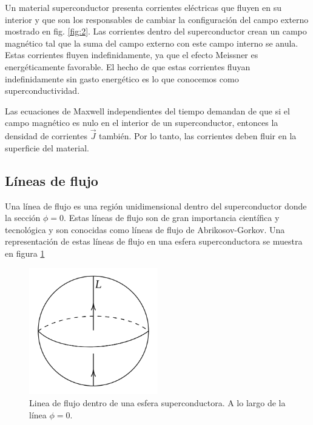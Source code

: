 Un material superconductor presenta corrientes eléctricas que fluyen en su interior y que son los responsables de cambiar la configuración del campo externo mostrado en fig. \ref{fig:2}. Las corrientes dentro del superconductor crean un campo magnético tal que la suma del campo externo con este campo interno se anula. Estas corrientes fluyen indefinidamente, ya que el efecto Meissner es energéticamente favorable. El hecho de que estas corrientes fluyan indefinidamente sin gasto energético es lo que conocemos como superconductividad.

Las ecuaciones de Maxwell independientes del tiempo demandan de que si el campo magnético es nulo en el interior de un superconductor, entonces la densidad de corrientes $\vec J$ también. Por lo tanto, las corrientes deben fluir en la superficie del material.

\subsection{Líneas de flujo}

Una línea de flujo es una región unidimensional dentro del superconductor donde la sección $\phi=0$. Estas líneas de flujo son de gran importancia científica y tecnológica y son conocidas como líneas de flujo de Abrikosov-Gorkov. Una representación de estas líneas de flujo en una esfera superconductora se muestra en figura \ref{fig:3}

\begin{figure}[ht]
	\centering
	\includegraphics[width=0.5\textwidth]{gfx/fluxline.png}
	\caption{Linea de flujo dentro de una esfera superconductora. A lo largo de la línea $\phi=0$.}
	\label{fig:3}
\end{figure}

